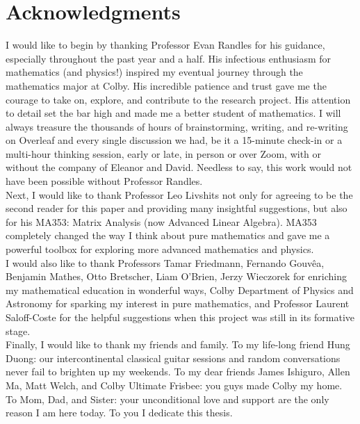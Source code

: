 \documentclass[11pt, letter]{book}
\begin{document}
\newpage
\section*{Acknowledgments} 


I would like to begin by thanking Professor Evan Randles for his guidance, especially throughout the past year and a half. His infectious enthusiasm for mathematics (and physics!) inspired my eventual journey through the mathematics major at Colby. His incredible patience and trust gave me the courage to take on, explore, and contribute to the research project. His attention to detail set the bar high and made me a better student of mathematics. I will always treasure the thousands of hours of brainstorming, writing, and re-writing on Overleaf and every single discussion we had, be it a 15-minute check-in or a multi-hour thinking session, early or late, in person or over Zoom, with or without the company of Eleanor and David. Needless to say, this work would not have been possible without Professor Randles.\\


Next, I would like to thank Professor Leo Livshits not only for agreeing to be the second reader for this paper and providing many insightful suggestions, but also for his MA353: Matrix Analysis (now Advanced Linear Algebra). MA353 completely changed the way I think about pure mathematics and gave me a powerful toolbox for
exploring more advanced mathematics and physics.  \\


I would also like to thank Professors Tamar Friedmann, Fernando Gouv\^{e}a, Benjamin Mathes, Otto Bretscher, Liam O'Brien, Jerzy Wieczorek for enriching my mathematical education in wonderful ways, Colby Department of Physics and Astronomy for sparking my interest in pure mathematics, and Professor Laurent Saloff-Coste for the helpful suggestions when this project was still in its formative stage.  \\



Finally, I would like to thank my friends and family. To my life-long friend Hung Duong: our intercontinental classical guitar sessions and random conversations never fail to brighten up my weekends. To my dear friends James Ishiguro,  Allen Ma, Matt Welch, and Colby Ultimate Frisbee: you guys made Colby my home. To Mom, Dad, and Sister: your unconditional love and support are the only reason I am here today. To you I dedicate this thesis.
\end{document}
